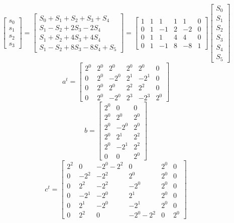 \documentclass{article}%
\begin{document}
\[%
\left[\begin{matrix}s_{0}\\s_{1}\\s_{2}\\s_{3}\end{matrix}\right] = \left[\begin{matrix}S_{0} + S_{1} + S_{2} + S_{3} + S_{4}\\S_{1} - S_{2} + 2 S_{3} - 2 S_{4}\\S_{1} + S_{2} + 4 S_{3} + 4 S_{4}\\S_{1} - S_{2} + 8 S_{3} - 8 S_{4} + S_{5}\end{matrix}\right] = \left[\begin{matrix}1 & 1 & 1 & 1 & 1 & 0\\0 & 1 & -1 & 2 & -2 & 0\\0 & 1 & 1 & 4 & 4 & 0\\0 & 1 & -1 & 8 & -8 & 1\end{matrix}\right] \left[\begin{matrix}S_{0}\\S_{1}\\S_{2}\\S_{3}\\S_{4}\\S_{5}\end{matrix}\right]%
\]%
\[%
a^{t} = \left[\begin{matrix}2^{0} & 2^{0} & 2^{0} & 2^{0} & 2^{0} & 0\\0 & 2^{0} & - 2^{0} & 2^{1} & - 2^{1} & 0\\0 & 2^{0} & 2^{0} & 2^{2} & 2^{2} & 0\\0 & 2^{0} & - 2^{0} & 2^{3} & - 2^{3} & 2^{0}\end{matrix}\right]%
\]%
\[%
b = \left[\begin{matrix}2^{0} & 0 & 0\\2^{0} & 2^{0} & 2^{0}\\2^{0} & - 2^{0} & 2^{0}\\2^{0} & 2^{1} & 2^{2}\\2^{0} & - 2^{1} & 2^{2}\\0 & 0 & 2^{0}\end{matrix}\right]%
\]%
\[%
c^{t} = \left[\begin{matrix}2^{2} & 0 & - 2^{0} - 2^{2} & 0 & 2^{0} & 0\\0 & - 2^{2} & - 2^{2} & 2^{0} & 2^{0} & 0\\0 & 2^{2} & - 2^{2} & - 2^{0} & 2^{0} & 0\\0 & - 2^{1} & - 2^{0} & 2^{1} & 2^{0} & 0\\0 & 2^{1} & - 2^{0} & - 2^{1} & 2^{0} & 0\\0 & 2^{2} & 0 & - 2^{0} - 2^{2} & 0 & 2^{0}\end{matrix}\right]%
\]%
\end{document}

